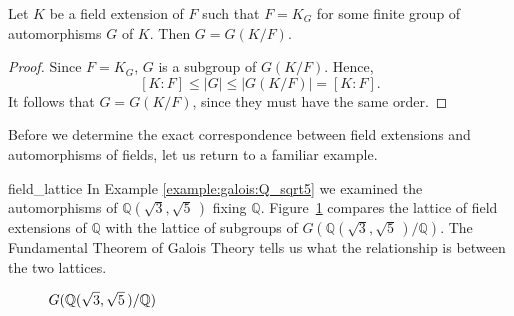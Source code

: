 
\begin{corollary}
Let $K$ be a field extension of $F$ such that $F = K_G$ for some
finite group of automorphisms $G$ of $K$. Then $G = G(K/F)$. 
\end{corollary}
 
 
\begin{proof}
Since $F = K_G$, $G$ is a subgroup of $G(K/F)$. Hence,
\[
[K : F ]  \leq |G| \leq |G(K/F)| = [K:F].
\]
It follows that $G = G(K/F)$, since they must have the same order.
\end{proof}
 
 
\medskip
 
 
Before we determine the exact correspondence between field extensions
and automorphisms of fields, let us return to a familiar example. 
 

\begin{example}{field_lattice}
In Example \ref{example:galois:Q_sqrt5} we examined the automorphisms of ${\mathbb Q}( \sqrt{3},
\sqrt{5}\, )$ fixing ${\mathbb Q}$. Figure~\ref{Galois1}  compares the
lattice of field extensions of ${\mathbb Q}$ with the lattice of
subgroups of $G( {\mathbb Q}( \sqrt{3}, \sqrt{5}\, ) /{\mathbb Q})$.
The Fundamental Theorem of Galois Theory tells us what the 
relationship is between the two lattices.
\end{example} 
 


\begin{figure}[t]
\begin{center}
\end{center}
\caption{$G({\mathbb Q}( \protect\sqrt{3}, \protect\sqrt{5}\, ) / {\mathbb
Q})$} 
\label{Galois1}
\end{figure}
 
